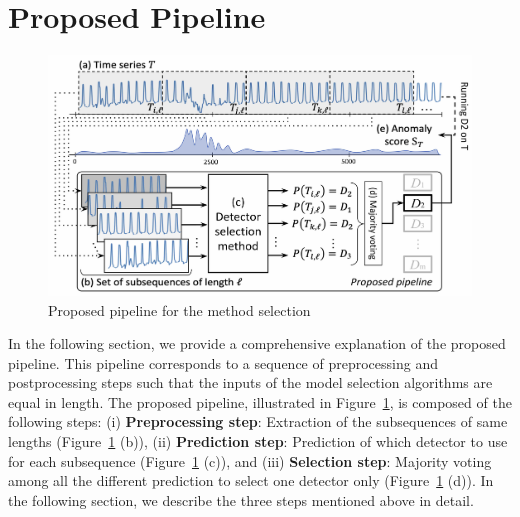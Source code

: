 \vspace{-0.1cm}
\section{Proposed Pipeline}
\label{sec:proposed}

\begin{figure}
    \centering
    \includegraphics[width=0.94\linewidth]{figures/3_pipeline.jpg}
    \vspace{-0.3cm}
    \caption{Proposed pipeline for the method selection}
    \label{fig:proposed_work}
    \vspace{-0.3cm}
\end{figure}

In the following section, we provide a comprehensive explanation of the proposed pipeline. This pipeline corresponds to a sequence of preprocessing and postprocessing steps such that the inputs of the model selection algorithms are equal in length. The proposed pipeline, illustrated in Figure~\ref{fig:proposed_work}, is composed of the following steps: (i) \textbf{Preprocessing step}: Extraction of the subsequences of same lengths (Figure~\ref{fig:proposed_work} (b)), (ii) \textbf{Prediction step}: Prediction of which detector to use for each subsequence (Figure~\ref{fig:proposed_work} (c)), and (iii) \textbf{Selection step}: Majority voting among all the different prediction to select one detector only (Figure~\ref{fig:proposed_work} (d)). In the following section, we describe the three steps mentioned above in detail.

\vspace{-0.1cm}
